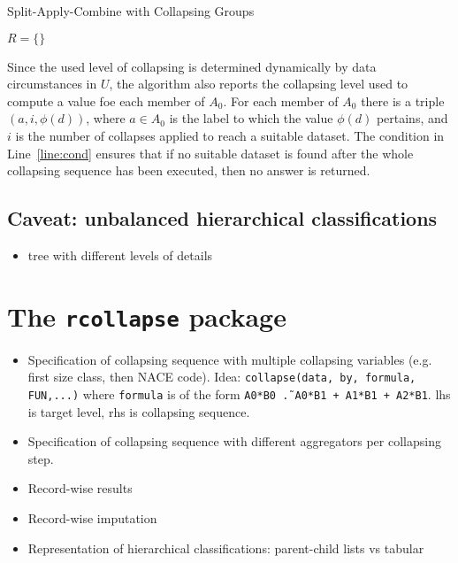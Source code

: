 \documentclass[11pt, fleqn]{article}
\begin{document}
%
\begin{algorithm}[H]
\caption{Split-Apply-Combine with Collapsing Groups}
\label{alg:saccg}


$R = \{\}$\;

\end{algorithm}
%
Since the used level of collapsing is determined dynamically by data
circumstances in $U$, the algorithm also reports the collapsing level used to
compute a value foe each member of $A_0$. For each member of $A_0$ there is a
triple $(a,i,\phi(d))$, where $a\in A_0$ is the label to which the value
$\phi(d)$ pertains, and $i$ is the number of collapses applied to reach a
suitable dataset. The condition in Line~\ref{line:cond} ensures that if
no suitable dataset is found after the whole collapsing sequence has been
executed, then no answer is returned.



\subsection{Caveat: unbalanced hierarchical classifications}
\begin{itemize}
\item tree with different levels of details
\end{itemize}

\section{The \texttt{rcollapse} package}

\begin{itemize}
\item{Specification of collapsing sequence with multiple collapsing variables (e.g. first size class, then NACE code). Idea: \texttt{collapse(data, by, formula, FUN,...)} where \texttt{formula} is
of the form \texttt{A0*B0 \~. A0*B1 + A1*B1 + A2*B1}. lhs is target level, rhs is collapsing sequence. }
\item{Specification of collapsing sequence with different aggregators per collapsing step.}
\item{Record-wise results}
\item{Record-wise imputation}
\item{Representation of hierarchical classifications: parent-child lists vs tabular}
\end{itemize}



\end{document}

